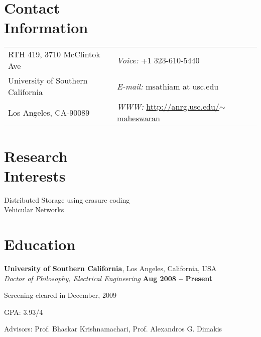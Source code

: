 \documentclass[margin,line]{resume}
\begin{document}
\begin{resume}


\section{\mysidestyle Contact\\Information}


\begin{tabular}{@{}p{3in}p{6in}}
RTH 419, 3710 McClintok Ave & {\it Voice:}  +1 323-610-5440 \\            
University of Southern California & {\it E-mail:}  msathiam at usc.edu\\
Los Angeles, CA-90089 & {\it WWW:} \href{http://anrg.usc.edu/~maheswaran}{http://anrg.usc.edu/$\sim$maheswaran} \\     
\end{tabular}

    \section{\mysidestyle Research\\Interests}

    Distributed Storage using erasure coding\\Vehicular Networks


    \section{\mysidestyle Education}

    \textbf{University of Southern California}, Los Angeles, California, USA \\%
    \textsl{Doctor of Philosophy, Electrical Engineering} \hfill \textbf{ Aug 2008 -- Present}\vspace{-3mm}\\\vspace{-1mm}
    \begin{list2}
        \item Screening cleared in December, 2009
        \item GPA: 3.93/4
        \item Advisors:  Prof. Bhaskar Krishnamachari, Prof. Alexandros G. Dimakis
    \end{list2}\vspace{-1.5mm}
    

\end{resume}
\end{document}
